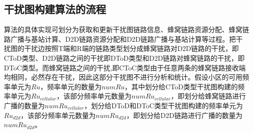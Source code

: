 \documentclass[figurelist,tablelist,algorithmlist,nomlist,masters]{seuthesix}
\begin{document}
	\subsection{干扰图构建算法的流程}
	
	
	算法的具体实现可划分为获取和更新干扰图链路信息、蜂窝链路资源分配、蜂窝链路广播与基站计算、D2D链路资源分配和D2D链路广播与基站计算等过程。把干扰图的干扰边按照T端和R端的链路类型划分成蜂窝链路对D2D链路的干扰，即CToD类型、D2D链路之间的干扰即DToD类型和D2D链路对蜂窝链路的干扰，即DToC类型。而蜂窝链路之间的干扰,即CToC类型由于任意两条的蜂窝链路接收端均相同，必然存在干扰，因此这部分干扰图不进行分析和统计。假设小区的可用频率单元为$Ru$，频率单元的数量为$numRu$，其中划分给CToD类型干扰图构建的频率单元为$R{u_{cellular}}$，该部分频率单元数量为$numR{u_{cellular}}$，即划分给蜂窝链路进行广播的数量为$numR{u_{cellular}}$，划分给DToD和DToC类型干扰图构建的频率单元为$R{u_{d2d}}$，该部分频率单元数量为$numR{u_{d2d}}$，即划分给D2D链路进行广播的数量为$numR{u_{d2d}}$。
	
\end{document}
